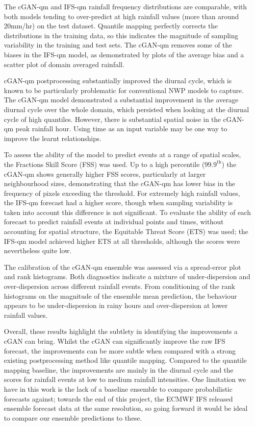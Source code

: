 \documentclass{article}
\begin{document}
The cGAN-qm and IFS-qm rainfall frequency distributions are comparable, with both models tending to over-predict at high rainfall values (more than around 20mm/hr) on the test dataset. Quantile mapping perfectly corrects the distributions in the training data, so this indicates the magnitude of sampling variability in the training and test sets. The cGAN-qm removes some of the biases in the IFS-qm model, as demonstrated by plots of the average bias and a scatter plot of domain averaged rainfall.

cGAN-qm postprocessing substantially improved the diurnal cycle, which is known to be particularly problematic for conventional NWP models to capture. The cGAN-qm model demonstrated a substantial improvement in the average diurnal cycle over the whole domain, which persisted when looking at the diurnal cycle of high quantiles. However, there is substantial spatial noise in the cGAN-qm peak rainfall hour. Using time as an input variable may be one way to improve the learnt relationships.

To assess the ability of the model to predict events at a range of spatial scales, the Fractions Skill Score (FSS) was used. Up to a high percentile ($99.9^{\text{th}}$) the cGAN-qm shows generally higher FSS scores, particularly at larger neighbourhood sizes, demonstrating that the cGAN-qm has lower bias in the frequency of pixels exceeding the threshold. For extremely high rainfall values, the IFS-qm forecast had a higher score, though when sampling variability is taken into account this difference is not significant. To evaluate the ability of each forecast to predict rainfall events at individual points and times, without accounting for spatial structure, the Equitable Threat Score (ETS) was used; the IFS-qm model achieved higher ETS at all thresholds, although the scores were nevertheless quite low.



The calibration of the cGAN-qm ensemble was assessed via a spread-error plot and rank histograms. Both diagnostics indicate a mixture of under-dispersion and over-dispersion across different rainfall events. From conditioning of the rank histograms on the magnitude of the ensemble mean prediction, the behaviour appears to be under-dispersion in rainy hours and over-dispersion at lower rainfall values.

Overall, these results highlight the subtlety in identifying the improvements a cGAN can bring. Whilst the cGAN can significantly improve the raw IFS forecast, the improvements can be more subtle when compared with a strong existing postprocessing method like quantile mapping. Compared to the quantile mapping baseline, the improvements are mainly in the diurnal cycle and the scores for rainfall events at low to medium rainfall intensities. One limitation we have in this work is the lack of a baseline ensemble to compare probabilistic forecasts against; towards the end of this project, the ECMWF IFS released ensemble forecast data at the same resolution, so going forward it would be ideal to compare our ensemble predictions to these. 
 
\end{document}
